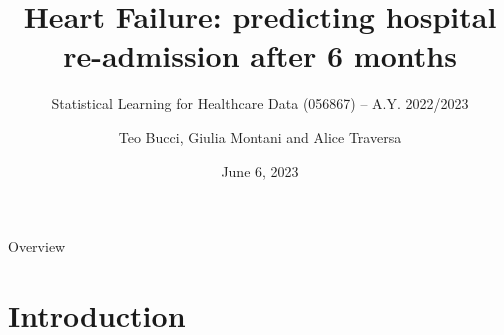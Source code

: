 \documentclass[aspectratio=169,xcolor=dvipsnames]{beamer}
\title[short title]{Heart Failure: predicting hospital re-admission after 6 months} %
\subtitle{Statistical Learning for Healthcare Data (056867) -- A.Y. 2022/2023}
\author[]{Teo Bucci, Giulia Montani and Alice Traversa}
\institute[NTU] %
{
    Politecnico di Milano%
}
\date{June 6, 2023} %
\begin{document}
\begin{frame}
    \titlepage
\end{frame}

\begin{frame}{Overview}
    \tableofcontents
\end{frame}



% 
% 
% 




\section{Introduction}
\end{document}
